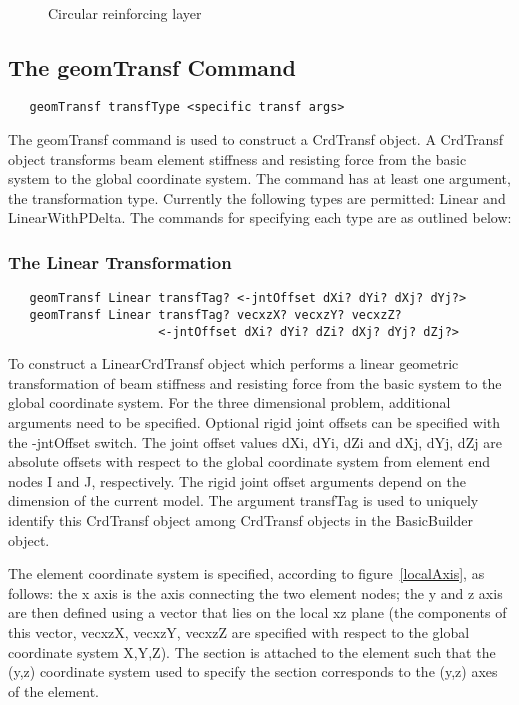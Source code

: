 \documentclass[12pt]{article}
\begin{document}
\begin{figure}[htpb]
\begin{center}
\leavevmode
\hbox{%
}
\end{center}
\caption{Circular reinforcing layer}
\label{circLayer}
\end{figure}


\subsection{The geomTransf Command}
{\sf\small
\begin{verbatim}
   geomTransf transfType <specific transf args>
\end{verbatim}
}

The geomTransf command is used to construct a CrdTransf object. A CrdTransf
object transforms beam element stiffness and resisting force from the 
basic system to the global coordinate system. The command has at least one 
argument, the transformation type. Currently the following types are 
permitted: Linear and LinearWithPDelta. The commands for specifying each 
type are as outlined below: 

\subsubsection{The Linear Transformation}
{\sf\small
\begin{verbatim}
   geomTransf Linear transfTag? <-jntOffset dXi? dYi? dXj? dYj?>
   geomTransf Linear transfTag? vecxzX? vecxzY? vecxzZ?
                     <-jntOffset dXi? dYi? dZi? dXj? dYj? dZj?>
\end{verbatim}
}

To construct a LinearCrdTransf object which performs a linear geometric
transformation of beam stiffness and resisting force from the basic system
to the global coordinate system. For the three dimensional problem,
additional arguments need to be specified. Optional rigid joint
offsets can be specified with the -jntOffset switch. The joint offset
values dXi, dYi, dZi and dXj, dYj, dZj are absolute offsets with
respect to the global coordinate system from element end nodes I and
J, respectively. The rigid joint offset arguments depend on the
dimension of the current model. The argument transfTag is used to
uniquely identify this CrdTransf object among CrdTransf objects in the
BasicBuilder object. 

The element coordinate system is specified, according to
figure~\ref{localAxis}, as follows: the x axis is the axis connecting
the two element nodes; the y and z axis are then defined using a
vector that lies on the local xz plane (the components of this vector,
vecxzX, vecxzY, vecxzZ are specified with respect to the global
coordinate system X,Y,Z). The section is attached to the element such
that the (y,z) coordinate system used to specify the section
corresponds to the (y,z) axes of the element. 
\end{document}

